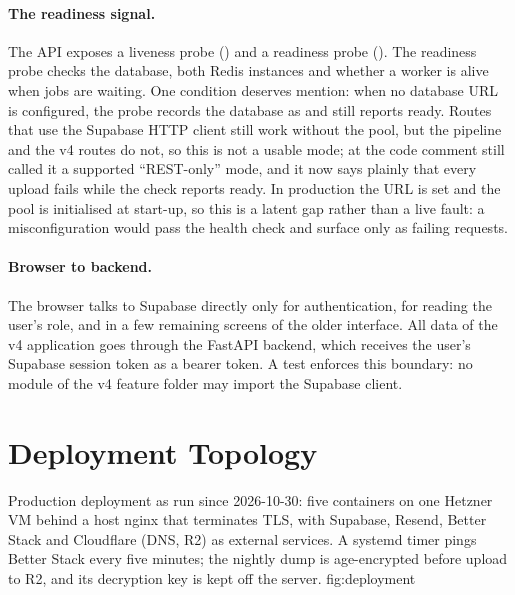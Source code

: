 \paragraph{The readiness signal.}
The API exposes a liveness probe () and a readiness probe
(). The readiness probe checks the database, both Redis
instances and whether a worker is alive when jobs are waiting. One condition
deserves mention: when no database URL is configured, the probe records the
database as  and still reports ready. Routes that use the
Supabase HTTP client still work without the pool, but the pipeline and the v4
routes do not, so this is not a usable mode; at \code{\thesisPreviousCommit} the
code comment still called it a supported ``REST-only'' mode, and it now says
plainly that every upload fails while the check reports ready. In
production the URL is set and the pool is initialised at start-up, so this is a
latent gap rather than a live fault: a misconfiguration would pass the health
check and surface only as failing requests.

\paragraph{Browser to backend.}
The browser talks to Supabase directly only for authentication, for reading the
user's role, and in a few remaining screens of the older interface. All data of
the v4 application goes through the FastAPI backend, which receives the user's
Supabase session token as a bearer token. A test enforces this boundary: no
module of the v4 feature folder may import the Supabase client.

\section{Deployment Topology}
\label{sec:deployment}

  {Production deployment as run since 2026-10-30: five containers on one
   Hetzner VM behind a host nginx that terminates TLS, with Supabase, Resend,
   Better Stack and Cloudflare (DNS, R2) as external services. A systemd timer
   pings Better Stack every five minutes; the nightly dump is age-encrypted
   before upload to R2, and its decryption key is kept off the server.}
  {fig:deployment}

